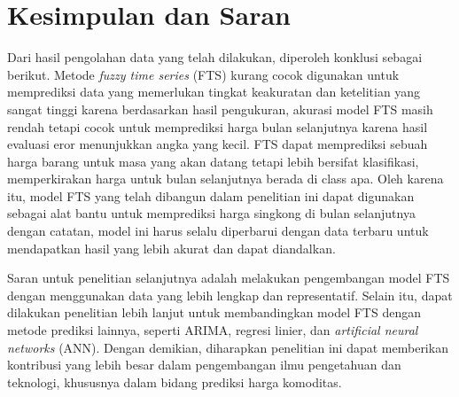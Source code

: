 \documentclass[conference]{IEEEtran}
\begin{document}
\section{Kesimpulan dan Saran}
Dari hasil pengolahan data yang telah dilakukan, diperoleh konklusi sebagai berikut. Metode \textit{fuzzy time series} (FTS) kurang cocok digunakan untuk memprediksi data yang memerlukan tingkat keakuratan dan ketelitian yang sangat tinggi karena berdasarkan hasil pengukuran, akurasi model FTS masih rendah tetapi cocok untuk memprediksi harga bulan selanjutnya karena hasil evaluasi eror menunjukkan angka yang kecil. FTS dapat memprediksi sebuah harga barang untuk masa yang akan datang tetapi lebih bersifat klasifikasi, memperkirakan harga untuk bulan selanjutnya berada di class apa. Oleh karena itu, model FTS yang telah dibangun dalam penelitian ini dapat digunakan sebagai alat bantu untuk memprediksi harga singkong di bulan selanjutnya dengan catatan, model ini harus selalu diperbarui dengan data terbaru untuk mendapatkan hasil yang lebih akurat dan dapat diandalkan.

Saran untuk penelitian selanjutnya adalah melakukan pengembangan model FTS dengan menggunakan data yang lebih lengkap dan representatif. Selain itu, dapat dilakukan penelitian lebih lanjut untuk membandingkan model FTS dengan metode prediksi lainnya, seperti ARIMA, regresi linier, dan \textit{artificial neural networks} (ANN). Dengan demikian, diharapkan penelitian ini dapat memberikan kontribusi yang lebih besar dalam pengembangan ilmu pengetahuan dan teknologi, khususnya dalam bidang prediksi harga komoditas.
\end{document}
